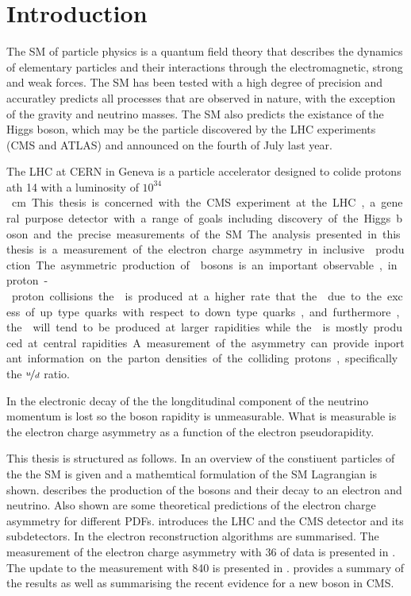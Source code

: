 \chapter{Introduction}
\label{chap:introduction}

The \ac{SM} of particle physics is a quantum field theory that describes the
dynamics of elementary particles and their interactions through the
electromagnetic, strong and weak forces. The \ac{SM} has been tested with a high
degree of precision and accuratley predicts all processes that are
observed in nature, with the exception of the gravity and neutrino masses. The
\ac{SM} also predicts the existance of the Higgs boson, which may be the
particle discovered by the \ac{LHC} experiments (\ac{CMS} and \ac{ATLAS}) and
announced on the fourth of July last year.

The \ac{LHC} at \ac{CERN} in Geneva is a particle accelerator designed to colide
protons ath \unit{14}{\TeV} with a luminosity of \unit{$10^{34}$}{cm}. This
thesis is concerned with the \ac{CMS} experiment at the \ac{LHC}, a general
purpose detector with a range of goals including discovery of the Higgs boson
and the precise measurements of the \ac{SM}.

The analysis presented in this thesis is a measurement of the electron charge
asymmetry in inclusive \PW production. The asymmetric production of \PW bosons
is an important observable, in proton-proton collisions the \PWp is  produced at
a higher rate that the \PWm due to the excess of up type quarks with respect to
down type quarks, and furthermore, the \PWp will tend to be produced at larger
rapidities while the \PWm is mostly produced at central rapidities. A
measurement of the asymmetry can provide inportant information on the parton
densities of the colliding protons, specifically the $\nicefrac{u}{d}$ ratio. 

In the electronic decay of the \PW the longditudinal component of the neutrino
momentum is lost so the boson rapidity is unmeasurable. What is measurable is
the electron charge asymmetry as a function of the electron pseudorapidity. 

This thesis is structured as follows. In  an overview of the
constiuent particles of the the \ac{SM} is given and a mathemtical formulation
of the \ac{SM} Lagrangian is shown.  describes the
production of the \PW bosons and their decay to an electron and neutrino. Also
shown are some theoretical predictions of the electron charge asymmetry for
different \acp{PDF}.  introduces the \ac{LHC} and the
\ac{CMS} detector and its subdetectors.  In  the
electron reconstruction algorithms are summarised.  The measurement of the
electron charge asymmetry with \unit{36}{\invpb} of data is presented in
. The update to the measurement with
\unit{840}{\invpb} is presented in .
 provides a summary of the results as well as
summarising the recent evidence for a new boson in \ac{CMS}.




